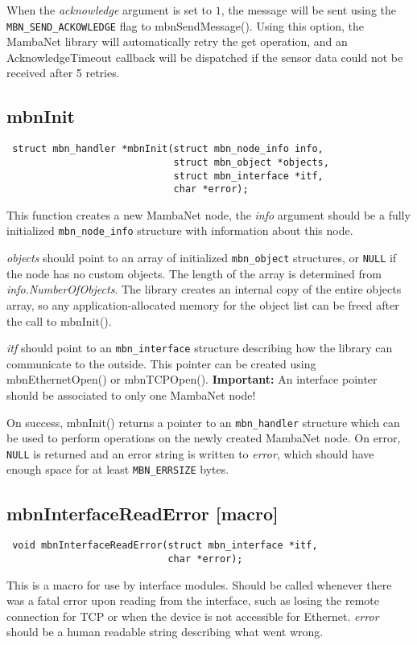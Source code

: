 \documentclass[a4paper]{report}
\begin{document}
When the \textit{acknowledge} argument is set to $1$, the message will be sent using the \verb|MBN_SEND_ACKOWLEDGE| flag to mbnSendMessage(). Using this option, the MambaNet library will automatically retry the get operation, and an AcknowledgeTimeout callback will be dispatched if the sensor data could not be received after 5 retries.


\subsection{mbnInit}
\begin{verbatim}
 struct mbn_handler *mbnInit(struct mbn_node_info info,
                             struct mbn_object *objects,
                             struct mbn_interface *itf,
                             char *error);
\end{verbatim}
This function creates a new MambaNet node, the \textit{info} argument should be a fully initialized \verb|mbn_node_info| structure with information about this node.

\textit{objects} should point to an array of initialized \verb|mbn_object| structures, or \verb|NULL| if the node has no custom objects. The length of the array is determined from \textit{info.NumberOfObjects}. The library creates an internal copy of the entire objects array, so any application-allocated memory for the object list can be freed after the call to mbnInit().

\textit{itf} should point to an \verb|mbn_interface| structure describing how the library can communicate to the outside. This pointer can be created using mbnEthernetOpen() or mbnTCPOpen(). \textbf{Important:} An interface pointer should be associated to only one MambaNet node!

On success, mbnInit() returns a pointer to an \verb|mbn_handler| structure which can be used to perform operations on the newly created MambaNet node. On error, \verb|NULL| is returned and an error string is written to \textit{error}, which should have enough space for at least \verb|MBN_ERRSIZE| bytes.


\subsection{mbnInterfaceReadError \footnotesize{[macro]}}
\begin{verbatim}
 void mbnInterfaceReadError(struct mbn_interface *itf,
                            char *error);
\end{verbatim}
This is a macro for use by interface modules. Should be called whenever there was a fatal error upon reading from the interface, such as losing the remote connection for TCP or when the device is not accessible for Ethernet. \textit{error} should be a human readable string describing what went wrong.
\end{document}
